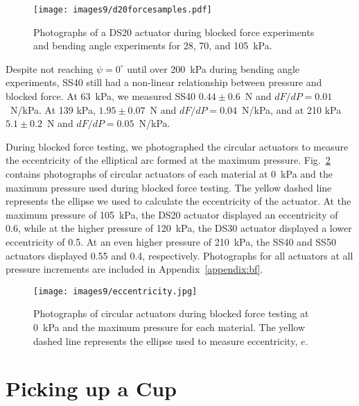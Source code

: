 \begin{figure}[!ht]
    \centering
     \texttt{[image: images9/d20forcesamples.pdf]}
    \caption{Photographs of a DS20 actuator during blocked force experiments and bending angle experiments for 28, 70, and 105~kPa.}
    \label{fig:d20force}
\end{figure}

Despite not reaching $\psi=0^\circ$ until over 200~kPa during bending angle experiments, SS40 still had a non-linear relationship between pressure and blocked force. At 63~kPa, we measured SS40 $0.44\pm0.6$~N and $dF/dP=0.01$~N/kPa. At 139 kPa, $1.95\pm0.07$~N and $dF/dP=0.04$~N/kPa, and at 210 kPa $5.1\pm0.2$~N and $dF/dP=0.05$~N/kPa.


\clearpage
During blocked force testing, we photographed the circular actuators to measure the eccentricity of the elliptical arc formed at the maximum pressure. Fig.~\ref{fig:eccentricity} contains photographs of circular actuators of each material at 0~kPa and the maximum pressure used during blocked force testing. The yellow dashed line represents the ellipse we used to calculate the eccentricity of the actuator. At the maximum pressure of 105~kPa, the DS20 actuator displayed an eccentricity of 0.6, while at the higher pressure of 120~kPa, the DS30 actuator displayed a lower eccentricity of 0.5. At an even higher pressure of 210~kPa, the SS40 and SS50 actuators displayed 0.55 and 0.4, respectively. Photographs for all actuators at all pressure increments are included in Appendix~\ref{appendix:bf}. 
\\
\begin{figure}[!ht]
    \centering
     \texttt{[image: images9/eccentricity.jpg]}
    \caption{Photographs of circular actuators during blocked force testing at 0~kPa and the maximum pressure for each material. The yellow dashed line represents the ellipse used to measure eccentricity, $e$.}
    \label{fig:eccentricity}
\end{figure}

\section{Picking up a Cup}

